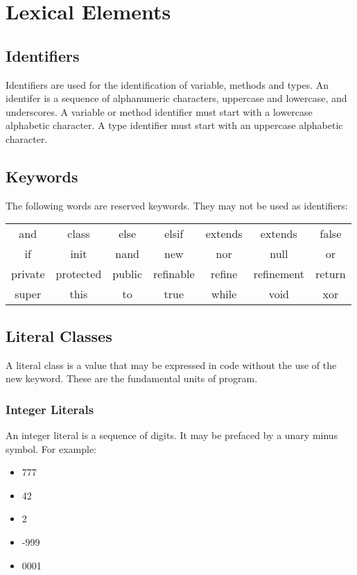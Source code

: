 \section{Lexical Elements}
\subsection{Identifiers}
Identifiers are used for the identification of variable,  methods and types. An identifer is a sequence of alphanumeric characters, uppercase and lowercase, and underscores. A variable or method identifier must start with a lowercase alphabetic character. A type identifier must start with an uppercase alphabetic character.

\subsection{Keywords}
The following words are reserved keywords. They may not be used as identifiers:
\begin{center}
\begin{tabular}{ccccccc}
and & class & else & elsif & extends & extends & false\\
if & init & nand & new & nor & null & or\\
private & protected & public & refinable & refine & refinement & return\\
super & this & to & true & while & void & xor\\
\end{tabular}
\end{center}

\subsection{Literal Classes}
A literal class is a value that may be expressed in code without the use of the new keyword. These are the fundamental units of program.

\subsubsection{Integer Literals}
An integer literal is a sequence of digits. It may be prefaced by a unary minus symbol. For example:
\begin{itemize}
\item 777
\item 42
\item 2
\item -999
\item 0001
\end{itemize}

